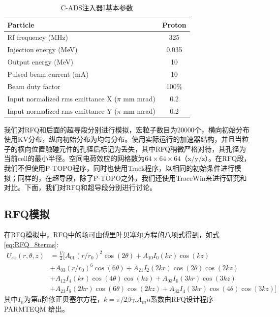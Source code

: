 \begin{table}[!htbp]
    \centering
    \footnotesize%
    \setlength{\tabcolsep}{4pt}%
    \renewcommand{\arraystretch}{1.2}%
    \begin{tabular}{lc}
        \hline\hline
        Particle                & Proton \\
        \hline
        Rf frequency (MHz)      & 325       \\
        \hline
        Injection energy (MeV)  & 0.035     \\
        \hline
        Output energy (MeV)     & 10        \\
        \hline
        Pulsed beam current (mA)& 10        \\
        \hline
        Beam duty factor        & 100\%     \\
        \hline
        Input normalized rms emittance X ($\pi$ mm mrad)    & 0.2        \\
        \hline
        Input normalized rms emittance Y ($\pi$ mm mrad)    & 0.2        \\
        \hline\hline
    \end{tabular}
    \caption{C-ADS注入器I基本参数}
    \label{tab:C_ADS_parameters}
\end{table}

我们对RFQ和后面的超导段分别进行模拟，宏粒子数目为20000个，横向初始分布使用KV分布，纵向初始分布为均匀分布。使用实际运行的加速器结构，并且当粒子的横向位置触碰元件的孔径后标记为丢失，其中RFQ稍微严格对待，其孔径为当前cell的最小半径。空间电荷效应的网格数为$64 \times 64 \times 64$（x/y/z）。在RFQ段，我们不但使用P-TOPO程序，同时也使用Track程序\cite{aseev2005track}，以相同的初始条件进行模拟；同样的，在超导段，除了P-TOPO之外，我们还使用TraceWin\cite{uriot2014tracewin}来进行研究和对比。下面，我们对RFQ和超导段分别进行讨论。

\subsection{RFQ模拟}
在RFQ模拟中，RFQ中的场可由傅里叶贝塞尔方程的八项式得到，如式\ref{eq:RFQ_8terms}:
\begin{equation}
    \begin{aligned}
       {{U}_{ex}}(r,\theta ,z) & =\frac{V}{2}[{{A}_{01}}{{(r/{{r}_{0}})}^{2}}\cos (2\theta )+{{A}_{10}}{{I}_{0}}(kr)\cos (kz) \\
     & +{{A}_{03}}{{(r/{{r}_{0}})}^{6}}\cos (6\theta )+{{A}_{21}}{{I}_{2}}(2kr)\cos (2\theta )\cos (2kz) \\
     & +{{A}_{12}}{{I}_{4}}(kr)\cos (4\theta )\cos (kz)+{{A}_{03}}{{I}_{0}}(3kr)\cos (3kz) \\
     & +{{A}_{23}}{{I}_{6}}(2kr)\cos (6\theta )\cos (2kz)+{{A}_{32}}{{I}_{4}}(3kr)\cos (4\theta )\cos (3kz)]
    \end{aligned}
    \label{eq:RFQ_8terms}
\end{equation}
其中$I_n$为第n阶修正贝塞尔方程，$k=\pi /2\beta \gamma$,$A_mn$系数由RFQ设计程序 PARMTEQM 给出。

